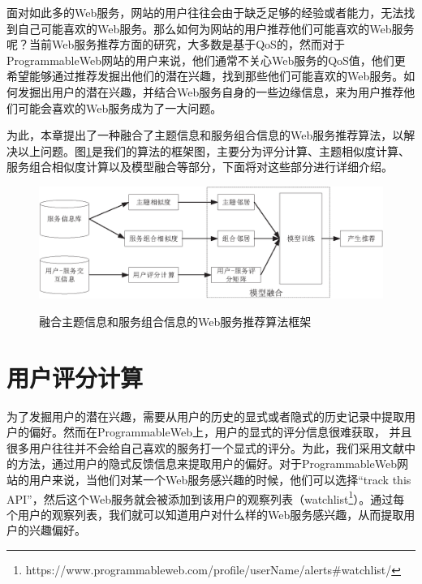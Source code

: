 \documentclass[master,winfonts]{njuthesis}
\begin{document}
面对如此多的Web服务，网站的用户往往会由于缺乏足够的经验或者能力，无法找到自己可能喜欢的Web服务。那么如何为网站的用户推荐他们可能喜欢的Web服务呢？当前Web服务推荐方面的研究，大多数是基于QoS的，然而对于ProgrammableWeb网站的用户来说，他们通常不关心Web服务的QoS值，他们更希望能够通过推荐发掘出他们的潜在兴趣，找到那些他们可能喜欢的Web服务。如何发掘出用户的潜在兴趣，并结合Web服务自身的一些边缘信息，来为用户推荐他们可能会喜欢的Web服务成为了一大问题。

为此，本章提出了一种融合了主题信息和服务组合信息的Web服务推荐算法，以解决以上问题。图\ref{fig:3-11}是我们的算法的框架图，主要分为评分计算、主题相似度计算、服务组合相似度计算以及模型融合等部分，下面将对这些部分进行详细介绍。
\begin{figure}[htbp]
  \centering
  \includegraphics[width=\textwidth]{TC_SV.eps}\\
  \caption{融合主题信息和服务组合信息的Web服务推荐算法框架}\label{fig:3-11}
\end{figure}


\section{用户评分计算}
为了发掘用户的潜在兴趣，需要从用户的历史的显式或者隐式的历史记录中提取用户的偏好。然而在ProgrammableWeb上，用户的显式的评分信息很难获取， 并且很多用户往往并不会给自己喜欢的服务打一个显式的评分。为此，我们采用文献\cite{Tian2014Time}中的方法，通过用户的隐式反馈信息来提取用户的偏好\cite{Dehkordi2015Incorporating}。对于ProgrammableWeb网站的用户来说，当他们对某一个Web服务感兴趣的时候，他们可以选择“track this API”，然后这个Web服务就会被添加到该用户的观察列表（watchlist\footnote{https://www.programmableweb.com/profile/userName/alerts\#watchlist/}）。通过每个用户的观察列表，我们就可以知道用户对什么样的Web服务感兴趣，从而提取用户的兴趣偏好。
\end{document}
